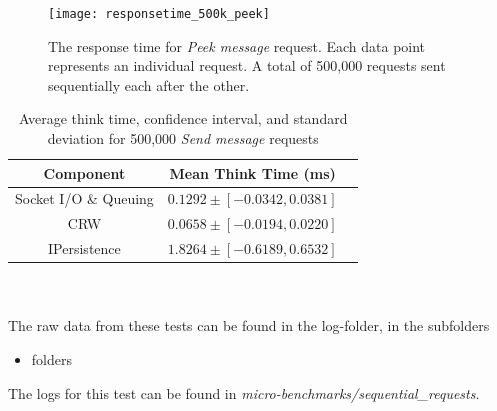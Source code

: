 \documentclass{article}
\begin{document}
                \begin{figure}[H]
                    \centering
                    \centerline{\texttt{[image: responsetime\_500k\_peek]}}
                    \caption{The response time for \textit{Peek message} request. Each data point represents an individual request. A total of 500,000 requests sent sequentially each after the other.}
                    \label{fig:responsetime_500k_peek}
                \end{figure}
                
                \begin{table}[H]
                    \centering
                    \begin{tabular}{|c|c|c|}
                        \hline 
                        \textbf{Component} & \textbf{Mean Think Time} (ms)\\ 
                        \hline 
                        Socket I/O \& Queuing & $0.1292\pm [-0.0342 , 0.0381]$\\ 
                        \hline 
                        CRW & $0.0658\pm [-0.0194 , 0.0220]$\\ 
                        \hline 
                        IPersistence &$1.8264\pm [-0.6189 , 0.6532]$\\ 
                        \hline 
                    \end{tabular}
                    \caption{Average think time, confidence interval, and standard deviation for 500,000 \textit{Send message} requests}
                    \label{table:thinktime_500k_peek}
                \end{table} 
                ~\\
                \\
                The raw data from these tests can be found in the log-folder, in the subfolders
                \begin{itemize}
                    \item folders
                \end{itemize}

        The logs for this test can be found in \textit{micro-benchmarks/sequential\_requests}.
\end{document}
